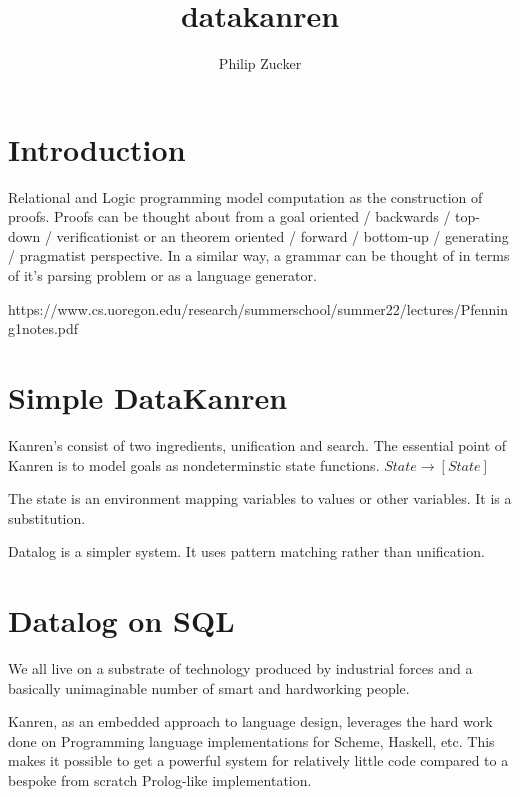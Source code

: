 

\title{datakanren}


\author{Philip Zucker}



\section{Introduction}

Relational and Logic programming model computation as the construction of proofs.
Proofs can be thought about from a goal oriented / backwards / top-down / verificationist or an theorem oriented / forward / bottom-up / generating / pragmatist perspective.
In a similar way, a grammar can be thought of in terms of it's parsing problem or as a language generator.

https://www.cs.uoregon.edu/research/summerschool/summer22/lectures/Pfenning1notes.pdf


\section{Simple DataKanren}

Kanren's consist of two ingredients, unification and search.
The essential point of Kanren is to model goals as nondeterminstic state functions.
$ State \rightarrow [State] $

The state is an environment mapping variables to values or other variables. It is a substitution.

Datalog is a simpler system. It uses pattern matching rather than unification.


\cite{datafrog}



\section{Datalog on SQL}

We all live on a substrate of technology produced by industrial forces 
and a basically unimaginable number of smart and hardworking people.

Kanren, as an embedded approach to language design,
leverages the hard work done on Programming language implementations for Scheme, Haskell, 
etc. This makes it possible to get a powerful system for relatively little code compared
to a bespoke from scratch Prolog-like implementation. 

